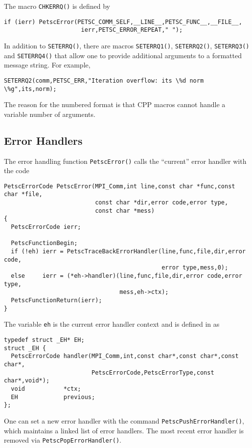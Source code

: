 The macro \lstinline{CHKERRQ()} is defined by
\begin{lstlisting}
if (ierr) PetscError(PETSC_COMM_SELF,__LINE__,PETSC_FUNC__,__FILE__,
                      ierr,PETSC_ERROR_REPEAT," ");
\end{lstlisting}

In addition to \lstinline{SETERRQ()}, there are macros \lstinline{SETERRQ1()}, \lstinline{SETERRQ2()}, \lstinline{SETERRQ3()}
and \lstinline{SETERRQ4()} that allow one to provide additional arguments to a formatted message string. For example,
\begin{lstlisting}
SETERRQ2(comm,PETSC_ERR,"Iteration overflow: its \%d norm \%g",its,norm);
\end{lstlisting}
The reason for the numbered format is that CPP macros cannot handle a variable number
of arguments.

\subsection{Error Handlers}
The error handling function \lstinline{PetscError()} calls the ``current'' error handler
with the code
\begin{lstlisting}
PetscErrorCode PetscError(MPI_Comm,int line,const char *func,const char *file,
                          const char *dir,error code,error type,
                          const char *mess)
{
  PetscErrorCode ierr;

  PetscFunctionBegin;
  if (!eh) ierr = PetscTraceBackErrorHandler(line,func,file,dir,error code,
                                             error type,mess,0);
  else     ierr = (*eh->handler)(line,func,file,dir,error code,error type,
                                 mess,eh->ctx);
  PetscFunctionReturn(ierr);
}
\end{lstlisting}
The variable \lstinline{eh} is the current error handler context and is defined in
 \href{http://www.mcs.anl.gov/petsc/petsc-master/src/sys/error/err.c.html}{} as
\begin{lstlisting}
typedef struct _EH* EH;
struct _EH {
  PetscErrorCode handler(MPI_Comm,int,const char*,const char*,const char*,
                         PetscErrorCode,PetscErrorType,const char*,void*);
  void           *ctx;
  EH             previous;
};
\end{lstlisting}

One can set a new error handler with the command \lstinline{PetscPushErrorHandler()},
which maintains a linked list of error handlers. 
The most recent error handler is removed
via \lstinline{PetscPopErrorHandler()}.

